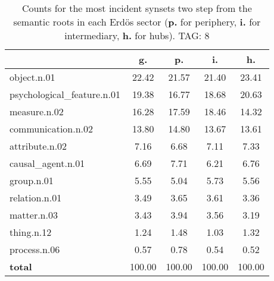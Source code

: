 \begin{table}[h!]
\begin{center}
\begin{tabular}{| l || c | c | c | c |}\hline
 & {\bf g.} & {\bf p.} & {\bf i.} & {\bf h.} \\\hline\hline
object.n.01 & 22.42  & 21.57  & 21.40  & 23.41 \\\hline
psychological\_feature.n.01 & 19.38  & 16.77  & 18.68  & 20.63 \\\hline
measure.n.02 & 16.28  & 17.59  & 18.46  & 14.32 \\\hline
communication.n.02 & 13.80  & 14.80  & 13.67  & 13.61 \\\hline
attribute.n.02 & 7.16  & 6.68  & 7.11  & 7.33 \\\hline
causal\_agent.n.01 & 6.69  & 7.71  & 6.21  & 6.76 \\\hline
group.n.01 & 5.55  & 5.04  & 5.73  & 5.56 \\\hline
relation.n.01 & 3.49  & 3.65  & 3.61  & 3.36 \\\hline
matter.n.03 & 3.43  & 3.94  & 3.56  & 3.19 \\\hline
thing.n.12 & 1.24  & 1.48  & 1.03  & 1.32 \\\hline
process.n.06 & 0.57  & 0.78  & 0.54  & 0.52 \\\hline\hline
{{\bf total}} & 100.00  & 100.00  & 100.00  & 100.00 \\\hline
\end{tabular}
\caption{Counts for the most incident synsets two step from the semantic roots in each Erd\"os sector ({\bf p.} for periphery, {\bf i.} for intermediary, {\bf h.} for hubs). TAG: 8}
\end{center}
\end{table}
